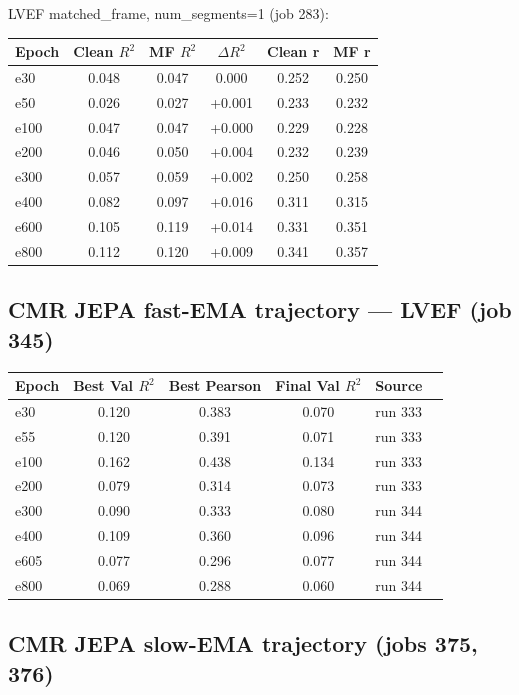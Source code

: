 \documentclass{article}
\begin{document}
LVEF matched\_frame, num\_segments=1 (job 283):
\begin{center}
\begin{tabular}{lccccc}
\toprule
Epoch & Clean $R^2$ & MF $R^2$ & $\Delta R^2$ & Clean r & MF r \\
\midrule
e30  & 0.048 & 0.047 & 0.000 & 0.252 & 0.250 \\
e50  & 0.026 & 0.027 & +0.001 & 0.233 & 0.232 \\
e100 & 0.047 & 0.047 & +0.000 & 0.229 & 0.228 \\
e200 & 0.046 & 0.050 & +0.004 & 0.232 & 0.239 \\
e300 & 0.057 & 0.059 & +0.002 & 0.250 & 0.258 \\
e400 & 0.082 & 0.097 & +0.016 & 0.311 & 0.315 \\
e600 & 0.105 & 0.119 & +0.014 & 0.331 & 0.351 \\
e800 & 0.112 & 0.120 & +0.009 & 0.341 & 0.357 \\
\bottomrule
\end{tabular}
\end{center}

\subsection{CMR JEPA fast-EMA trajectory --- LVEF (job 345)}

\begin{center}
\begin{tabular}{lccclc}
\toprule
Epoch & Best Val $R^2$ & Best Pearson & Final Val $R^2$ & Source \\
\midrule
e30  & 0.120 & 0.383 & 0.070 & run 333 \\
e55  & 0.120 & 0.391 & 0.071 & run 333 \\
e100 & 0.162 & 0.438 & 0.134 & run 333 \\
e200 & 0.079 & 0.314 & 0.073 & run 333 \\
e300 & 0.090 & 0.333 & 0.080 & run 344 \\
e400 & 0.109 & 0.360 & 0.096 & run 344 \\
e605 & 0.077 & 0.296 & 0.077 & run 344 \\
e800 & 0.069 & 0.288 & 0.060 & run 344 \\
\bottomrule
\end{tabular}
\end{center}

\subsection{CMR JEPA slow-EMA trajectory (jobs 375, 376)}
\end{document}
